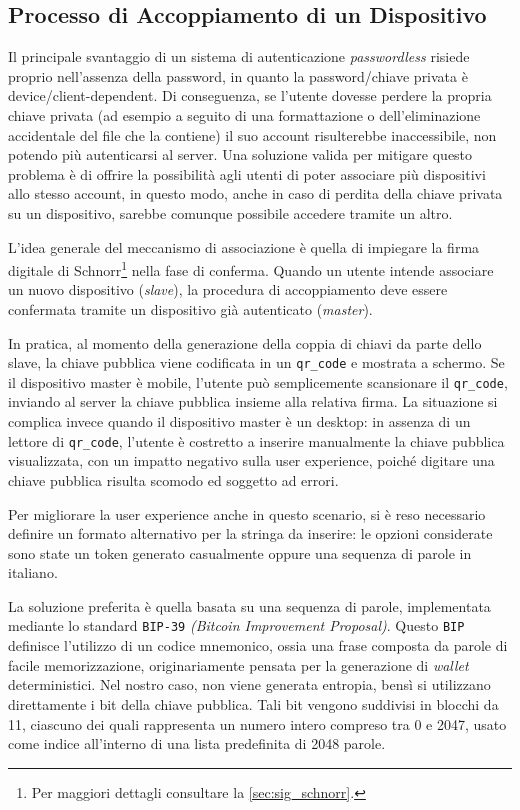 \noindent\hrulefill

\newpage

\subsection{Processo di Accoppiamento di un Dispositivo}

Il principale svantaggio di un sistema di autenticazione \textit{passwordless} risiede proprio nell'assenza della password, in quanto la password/chiave privata è device/client-dependent. Di conseguenza, se l'utente dovesse perdere la propria chiave privata (ad esempio a seguito di una formattazione o dell'eliminazione accidentale del file che la contiene) il suo account risulterebbe inaccessibile, non potendo più autenticarsi al server. 
Una soluzione valida per mitigare questo problema è di offrire la possibilità agli utenti di poter associare più dispositivi allo stesso account, in questo modo, anche in caso di perdita della chiave privata su un dispositivo, sarebbe comunque possibile accedere tramite un altro.

L'idea generale del meccanismo di associazione è quella di impiegare la firma digitale di Schnorr\footnote{Per maggiori dettagli consultare la \autoref{sec:sig_schnorr}.} nella fase di conferma. Quando un utente intende associare un nuovo dispositivo (\textit{slave}), la procedura di accoppiamento deve essere confermata tramite un dispositivo già autenticato (\textit{master}).

In pratica, al momento della generazione della coppia di chiavi da parte dello slave, la chiave pubblica viene codificata in un \texttt{qr\_code} e mostrata a schermo.
Se il dispositivo master è mobile, l'utente può semplicemente scansionare il \texttt{qr\_code}, inviando al server la chiave pubblica insieme alla relativa firma. La situazione si complica invece quando il dispositivo master è un desktop: in assenza di un lettore di \texttt{qr\_code}, l'utente è costretto a inserire manualmente la chiave pubblica visualizzata, con un impatto negativo sulla user experience, poiché digitare una chiave pubblica risulta scomodo ed soggetto ad errori.

Per migliorare la user experience anche in questo scenario, si è reso necessario definire un formato alternativo per la stringa da inserire: le opzioni considerate sono state un token generato casualmente oppure una sequenza di parole in italiano.

La soluzione preferita è quella basata su una sequenza di parole, implementata mediante lo standard \texttt{BIP-39} \textit{(Bitcoin Improvement Proposal)}\cite{BIP39}. Questo \texttt{BIP} definisce l'utilizzo di un codice mnemonico, ossia una frase composta da parole di facile memorizzazione, originariamente pensata per la generazione di \textit{wallet} deterministici. Nel nostro caso, non viene generata entropia, bensì si utilizzano direttamente i bit della chiave pubblica. Tali bit vengono suddivisi in blocchi da 11, ciascuno dei quali rappresenta un numero intero compreso tra 0 e 2047, usato come indice all'interno di una lista predefinita di 2048 parole.

